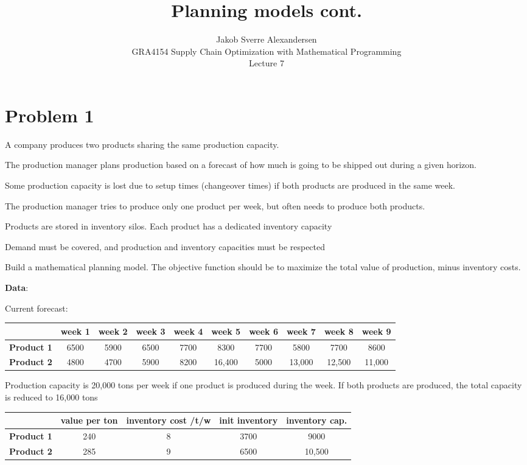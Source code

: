 \documentclass[10pt]{article}
\begin{document}
 
\title{Planning models cont.}
\author{Jakob Sverre Alexandersen\\
GRA4154 Supply Chain Optimization with Mathematical Programming\\
Lecture 7}
\maketitle

\tableofcontents
\newpage

\section{Problem 1}

A company produces two products sharing the same production capacity. 

The production manager plans production based on a forecast of how much is going to be shipped out during a given horizon. 

Some production capacity is lost due to setup times (changeover times) if both products are produced in the same week. 

The production manager tries to produce only one product per week, but often needs to produce both products. 

Products are stored in inventory silos. Each product has a dedicated inventory capacity

Demand must be covered, and production and inventory capacities must be respected 

Build a mathematical planning model. The objective function should be to maximize the total value of production, minus inventory costs. 

\textbf{Data}: 

Current forecast:
\begin{center}
    \begin{tabular}{|c|c|c|c|c|c|c|c|c|c|}
        \hline 
        & week 1& week 2& week 3& week 4& week 5& week 6& week 7& week 8& week 9\\\hline 
        \textbf{Product 1} & 6500 & 5900 & 6500 & 7700 & 8300 & 7700 & 5800 & 7700 & 8600 \\\hline 
        \textbf{Product 2} & 4800 & 4700 & 5900 & 8200 & 16,400 & 5000 & 13,000 & 12,500 & 11,000 \\\hline 
    \end{tabular}
\end{center}

Production capacity is 20,000 tons per week if one product is produced during the week. If both products are produced, the total capacity is reduced to 16,000 tons 
\begin{center}
    \begin{tabular}{|c|c|c|c|c|}
        \hline 
        & value per ton & inventory cost /t/w & init inventory & inventory cap. \\\hline 
        \textbf{Product 1} & 240 & 8 & 3700 & 9000\\\hline 
        \textbf{Product 2} & 285 & 9 & 6500 & 10,500\\\hline 
    \end{tabular}
\end{center}
\end{document}
